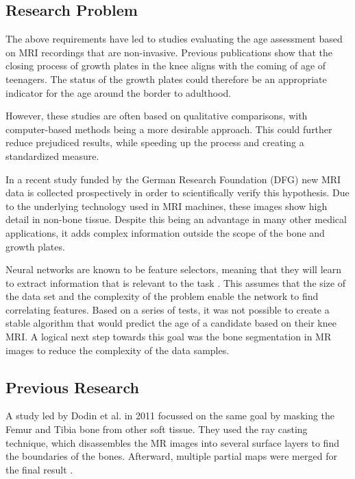 \subsection{Research Problem}

The above requirements have led to studies evaluating the age assessment based on MRI recordings that are non-invasive. Previous publications \cite{Saring2014}\cite{Jopp2007} show that the closing process of growth plates in the knee aligns with the coming of age of teenagers. The status of the growth plates could therefore be an appropriate indicator for the age around the border to adulthood.

However, these studies are often based on qualitative comparisons, with computer-based methods being a more desirable approach. This could further reduce prejudiced results, while speeding up the process and creating a standardized measure. 

In a recent study funded by the German Research Foundation (DFG) new MRI data is collected prospectively in order to scientifically verify this hypothesis. Due to the underlying technology used in MRI machines, these images show high detail in non-bone tissue. Despite this being an advantage in many other medical applications, it adds complex information outside the scope of the bone and growth plates.

Neural networks are known to be feature selectors, meaning that they will learn to extract information that is relevant to the task \cite{Setiono1997}. This assumes that the size of the data set and the complexity of the problem enable the network to find correlating features. Based on a series of tests, it was not possible to create a stable algorithm that would predict the age of a candidate based on their knee MRI. A logical next step towards this goal was the bone segmentation in MR images to reduce the complexity of the data samples.

\subsection{Previous Research}

A study led by Dodin et al. in 2011 focussed on the same goal by masking the Femur and Tibia bone from other soft tissue. They used the ray casting technique, which disassembles the MR images into several surface layers to find the boundaries of the bones. Afterward, multiple partial maps were merged for the final result \cite{Dodin2011}.

